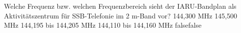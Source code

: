     {Welche Frequenz bzw. welchen Frequenzbereich sieht der IARU-Bandplan als Aktivitätszentrum für SSB-Telefonie im 2 m-Band vor?}
    {144,300 MHz}
    {145,500 MHz}
    {144,195 bis 144,205 MHz}
    {144,110 bis 144,160 MHz}
    {false}{false}